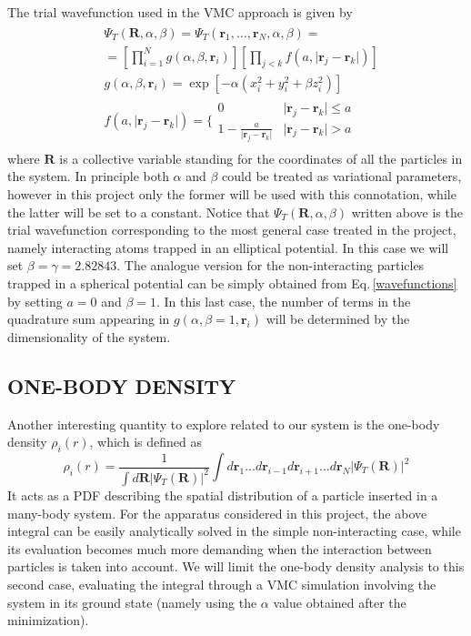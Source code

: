 The trial wavefunction used in the VMC approach is given by
\begin{align}
\begin{split}
    &\Psi_T(\bm{R},\alpha, \beta) = \Psi_T(\bm{r}_1, \dots, \bm{r}_N, \alpha, \beta) = \\
    &= \left[ \prod_{i=1}^N g(\alpha, \beta, \bm{r}_i) \right]  \left[ \prod_{j<k} f(a, \vert \bm{r}_j - \bm{r}_k \vert ) \right] \\
    &g(\alpha, \beta, \bm{r}_i) = \exp \left[ -\alpha \left( x_i^2 + y_i^2 + \beta z_i^2 \right) \right] \\
    &f(a, \vert \bm{r}_j - \bm{r}_k \vert ) = \Bigg\{ \begin{array}{ll}
        0 & \vert \bm{r}_j - \bm{r}_k \vert \leq a \\
        1 - \frac{a}{\vert \bm{r}_j - \bm{r}_k \vert} & \vert \bm{r}_j - \bm{r}_k \vert > a
    \end{array}
\end{split}
\label{wavefunctions}
\end{align}
where $\bm{R}$ is a collective variable standing for the coordinates of all the particles in the system. In principle both $\alpha$ and $\beta$ could be treated as variational parameters, however in this project only the former will be used with this connotation, while the latter will be set to a constant. Notice that $\Psi_T(\bm{R},\alpha,\beta)$ written above is the trial wavefunction corresponding to the most general case treated in the project, namely interacting atoms trapped in an elliptical potential. In this case we will set $\beta = \gamma = 2.82843$. The analogue version for the non-interacting particles trapped in a spherical potential can be simply obtained from Eq.\,\ref{wavefunctions} by setting $a=0$ and $\beta=1$. In this last case, the number of terms in the quadrature sum appearing in $g(\alpha, \beta=1, \bm{r}_i)$ will be determined by the dimensionality of the system. \\


\subsection{ONE-BODY DENSITY}
Another interesting quantity to explore related to our system is the one-body density $\rho_i(r)$, which is defined as
\begin{equation*}
    \rho_i(r) = \frac{1}{\int d\bm{R} \vert \Psi_T(\bm{R}) \vert^2} \int d\bm{r}_1 \dots d\bm{r}_{i-1} d\bm{r}_{i+1} \dots d\bm{r}_N \vert \Psi_T(\bm{R}) \vert^2
\end{equation*}
It acts as a PDF describing the spatial distribution of a particle inserted in a many-body system. For the apparatus considered in this project, the above integral can be easily analytically solved in the simple non-interacting case, while its evaluation becomes much more demanding when the interaction between particles is taken into account. We will limit the one-body density analysis to this second case, evaluating the integral through a VMC simulation involving the system in its ground state (namely using the $\alpha$ value obtained after the minimization). 




